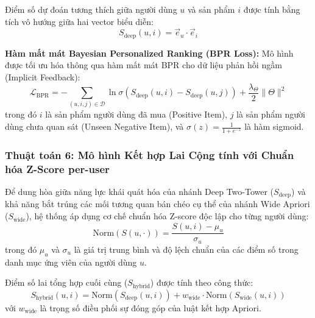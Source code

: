 \documentclass[12pt,a4paper]{report}
\begin{document}
Điểm số dự đoán tương thích giữa người dùng $u$ và sản phẩm $i$ được tính bằng tích vô hướng giữa hai vector biểu diễn:
\begin{equation}
    S_{\text{deep}}(u, i) = \vec{e}_u \cdot \vec{e}_i
\end{equation}

\textbf{Hàm mất mát Bayesian Personalized Ranking (BPR Loss):}
Mô hình được tối ưu hóa thông qua hàm mất mát BPR cho dữ liệu phản hồi ngầm (Implicit Feedback):
\begin{equation}
    \mathcal{L}_{\text{BPR}} = - \sum_{(u, i, j) \in \mathcal{D}} \ln \sigma(S_{\text{deep}}(u, i) - S_{\text{deep}}(u, j)) + \frac{\lambda_{\Theta}}{2} \|\Theta\|^2
\end{equation}
trong đó $i$ là sản phẩm người dùng đã mua (Positive Item), $j$ là sản phẩm người dùng chưa quan sát (Unseen Negative Item), và $\sigma(z) = \frac{1}{1 + e^{-z}}$ là hàm sigmoid.

\subsubsection{Thuật toán 6: Mô hình Kết hợp Lai Cộng tính với Chuẩn hóa Z-Score per-user}
Để dung hòa giữa năng lực khái quát hóa của nhánh Deep Two-Tower ($S_{\text{deep}}$) và khả năng bắt trúng các mối tương quan bán chéo cụ thể của nhánh Wide Apriori ($S_{\text{wide}}$), hệ thống áp dụng cơ chế chuẩn hóa Z-score độc lập cho từng người dùng:
\begin{equation}
    \text{Norm}(S(u, \cdot)) = \frac{S(u, i) - \mu_u}{\sigma_u}
\end{equation}
trong đó $\mu_u$ và $\sigma_u$ là giá trị trung bình và độ lệch chuẩn của các điểm số trong danh mục ứng viên của người dùng $u$.

Điểm số lai tổng hợp cuối cùng ($S_{\text{hybrid}}$) được tính theo công thức:
\begin{equation}
    S_{\text{hybrid}}(u, i) = \text{Norm}(S_{\text{deep}}(u, i)) + w_{\text{wide}} \cdot \text{Norm}(S_{\text{wide}}(u, i))
\end{equation}
với $w_{\text{wide}}$ là trọng số điều phối sự đóng góp của luật kết hợp Apriori.
\end{document}
